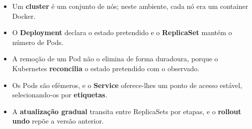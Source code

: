 \documentclass[11pt,a4paper]{article}
\begin{document}
\begin{itemize}
  \item Um \textbf{cluster} é um conjunto de nós; neste ambiente, cada nó era um container Docker.
  \item O \textbf{Deployment} declara o estado pretendido e o \textbf{ReplicaSet} mantém o número de Pods.
  \item A remoção de um Pod não o elimina de forma duradoura, porque o Kubernetes \textbf{reconcilia} o estado pretendido com o observado.
  \item Os Pods são efémeros, e o \textbf{Service} oferece-lhes um ponto de acesso estável, selecionando-os por \textbf{etiquetas}.
  \item A \textbf{atualização gradual} transita entre ReplicaSets por etapas, e o \textbf{rollout undo} repõe a versão anterior.
\end{itemize}
\end{document}
